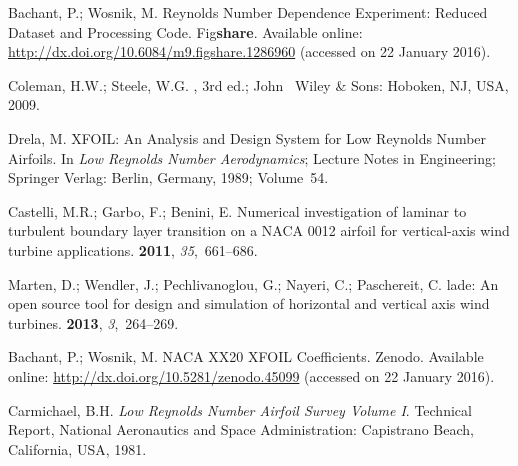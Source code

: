 \documentclass[energies,article,accept,moreauthors,pdftex,10pt,a4paper]{mdpi}
\theoremstyle{mdpi}
\newcounter{ex}
\newcounter{re}
\begin{document}
\begin{thebibliography}{999}
 Bachant, P.;
Wosnik, M.  {R}eynolds Number Dependence Experiment: Reduced
Dataset and Processing Code. \newblock Fig\textbf{share}. Available online:
\url{http://dx.doi.org/10.6084/m9.figshare.1286960} (accessed on 22 January
2016).

 Coleman, H.W.; Steele, W.G.
, 3rd ed.; John~ Wiley \& Sons: Hoboken, NJ, USA, 2009.

 Drela, M. \newblock XFOIL: An Analysis and
Design System for Low Reynolds Number Airfoils. In {\em Low Reynolds Number
    Aerodynamics}; Lecture Notes in Engineering; Springer Verlag: Berlin, Germany,
1989; Volume~54.

Castelli, M.R.; Garbo, F.; Benini, E.
\newblock Numerical investigation of laminar to turbulent boundary layer
 transition on a NACA 0012 airfoil for vertical-axis wind turbine
 applications.
 {\bf 2011}, {\em 35},~661--686.

 Marten, D.; Wendler, J.; Pechlivanoglou, G.; Nayeri, C.;
Paschereit, C. lade: An open source tool for design and simulation
of horizontal and vertical axis wind turbines.  {\bf 2013}, {\em 3},~264--269.

 Bachant, P.;
Wosnik, M. \newblock NACA XX20 XFOIL Coefficients. \newblock Zenodo. Available
online: \url{http://dx.doi.org/10.5281/zenodo.45099} (accessed on 22 January
2016).

 Carmichael, B.H. \newblock \emph{Low
    {R}eynolds Number Airfoil Survey Volume {I}}. \newblock Technical Report,
National Aeronautics and Space Administration: Capistrano Beach, California,
USA, 1981.

\end{thebibliography}
\end{document}
